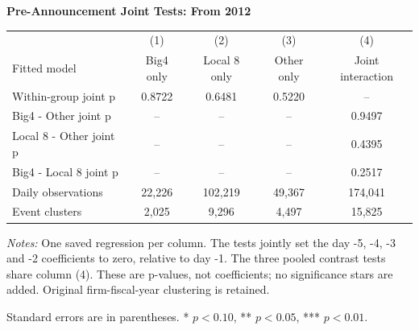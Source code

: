 \documentclass[10pt]{article}
\begin{document}
\begin{minipage}{18.40cm}
\fontsize{10}{12}\selectfont
\setlength{\tabcolsep}{4pt}\renewcommand{\arraystretch}{1.08}
{\large\bfseries Pre-Announcement Joint Tests: From 2012}\par\medskip
\begin{tabular*}{\linewidth}{@{\extracolsep{\fill}}lcccc@{}}
\toprule
 & (1) & (2) & (3) & (4) \\
Fitted model & Big4 only & Local 8 only & Other only & Joint interaction \\
\midrule
Within-group joint p & 0.8722 & 0.6481 & 0.5220 & -- \\
Big4 - Other joint p & -- & -- & -- & 0.9497 \\
Local 8 - Other joint p & -- & -- & -- & 0.4395 \\
Big4 - Local 8 joint p & -- & -- & -- & 0.2517 \\
\midrule
Daily observations & 22,226 & 102,219 & 49,367 & 174,041 \\
Event clusters & 2,025 & 9,296 & 4,497 & 15,825 \\
\bottomrule\end{tabular*}\par\medskip
\fontsize{9}{11}\selectfont\textit{Notes:} One saved regression per column. The tests jointly set the day -5, -4, -3 and -2 coefficients to zero, relative to day -1. The three pooled contrast tests share column (4). These are p-values, not coefficients; no significance stars are added. Original firm-fiscal-year clustering is retained.
\par Standard errors are in parentheses. * $p<0.10$, ** $p<0.05$, *** $p<0.01$.
\end{minipage}
\end{document}
